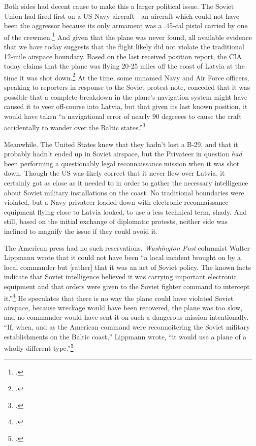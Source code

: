 \documentclass{report}
\begin{document}
\begin{refsegment}
Both sides had decent cause to make this a larger political issue. The Soviet Union had fired first on a US Navy aircraft---an aircraft which could not have been the aggressor because its only armament was a .45-cal pistol carried by one of the crewmen.\footcite[p.~7]{peterson_maybe_1993} And given that the plane was never found, all available evidence that we have today suggests that the flight likely did not violate the traditional 12-mile airspace boundary. Based on the last received position report, the CIA today claims that the plane was flying 20-25 miles off the coast of Latvia at the time it was shot down.\footcite[p.~7]{peterson_maybe_1993} At the time, some unnamed Navy and Air Force officers, speaking to reporters in response to the Soviet protest note, conceded that it was possible that a complete breakdown in the plane's navigation system might have caused it to veer off-course into Latvia, but that given its last known position, it would have taken ``a navigational error of nearly 90 degreees to cause the craft accidentally to wander over the Baltic states.''\footcite[Technically, the  article credits the first statement about the possible electronic breakdown to ``Navy and Air Force officials'' and the 90 degrees statement to ``Aerial navigators.'' It is unclear whether the navigators in questions are with the US military, but it does not matter regardless.]{the_new_york_times_soviet_1950}

Meanwhile, The United States knew that they hadn't lost a B-29, and that it probably hadn't ended up in Soviet airspace, but the Privateer in question \emph{had} been performing a questionably legal reconnaissance mission when it was shot down. Though the US was likely correct that it never flew over Latvia, it certainly got as close as it needed to in order to gather the necessary intelligence about Soviet military installations on the coast. No traditional boundaries were violated, but a Navy privateer loaded down with electronic reconnaissance equipment flying close to Latvia looked, to use a less technical term, shady. And still, based on the initial exchange of diplomatic protests, neither side was inclined to magnify the issue if they could avoid it.

The American press had no such reservations. \emph{Washington Post} columnist Walter Lippmann wrote that it could not have been ``a local incident brought on by a local commander but [rather] that it was an act of Soviet policy. The known facts indicate that Soviet intelligence \textelp{} believed it was carrying important electronic equipment and that orders were given to the Soviet fighter command to intercept it.''\footcite{lippmann_baltic_1950} He speculates that there is no way the plane could have violated Soviet airspace, because wreckage would have been recovered, the plane was too slow, and no commander would have sent it on such a dangerous mission intentionally. ``If, when, and as the American command were reconnoitering the Soviet military establishments on the Baltic coast,'' Lippmann wrote, ``it would use a plane of a wholly different type.''\footcite{lippmann_baltic_1950}


\end{refsegment}
\end{document}
